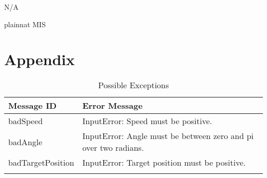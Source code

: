 \documentclass[12pt, titlepage]{article}
\begin{document}
N/A

\newpage

 {plainnat}
 {MIS}

\section{Appendix} \label{Appendix}

\renewcommand{\arraystretch}{1.2}

\begin{longtable}{l p{12cm}}
\toprule
\textbf{Message ID} & \textbf{Error Message} \\
\midrule
badSpeed & InputError: Speed must be positive.\\
badAngle & InputError: Angle must be between zero and pi over two radians.\\
badTargetPosition & InputError: Target position must be positive.\\
\bottomrule
\caption{Possible Exceptions} \\
\end{longtable}
\end{document}

